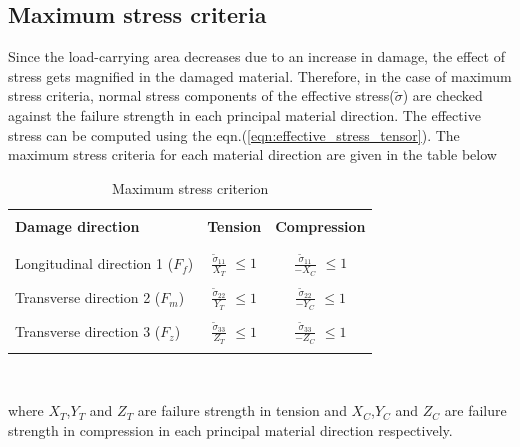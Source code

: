 \documentclass[12pt,twoside]{report}
\begin{document}
\subsection{Maximum stress criteria}\label{Maximum stress criteria}
\indent\indent\indent  Since the load-carrying area decreases due to an increase in damage, the effect of stress gets magnified in the damaged material. Therefore, in the case of maximum stress criteria, normal stress components of the effective stress($\tilde{\sigma}$) are checked against the failure strength in each principal material direction. The effective stress can be computed using the eqn.(\ref{eqn:effective_stress_tensor}). The maximum stress criteria for each material direction are given in the table below\\
\begin{table}[htbp]
  \begin{center}
     \begin{tabular}{l  c  c} 
     \hline
     \\
      \textbf{Damage direction} \;\;& \textbf{Tension} \;& \textbf{Compression}\\
      \\
      \hline
      \\
      Longitudinal direction 1 ($F_{f}$) & \Large{$\frac{\tilde{\sigma}_{11}}{X_{T}} $}\small{ $\leq 1$} & \Large{$\frac{\tilde{\sigma}_{11}}{-X_{C}} $}\small{ $\leq 1$} \\
      \\
      Transverse direction 2 ($F_{m}$)  &  \Large{$\frac{\tilde{\sigma}_{22}}{Y_{T}} $}\small{ $\leq 1$}  & \Large{$\frac{\tilde{\sigma}_{22}}{-Y_{C}} $}\small{ $\leq 1$}\\
      \\
      Transverse direction 3 ($F_{z}$) &  \Large{$\frac{\tilde{\sigma}_{33}}{Z_{T}} $}\small{ $\leq 1$}  &   \Large{$\frac{\tilde{\sigma}_{33}}{-Z_{C}} $}\small{ $\leq 1$}\\
       \\
       \hline
    \end{tabular}
    \\
    \caption{Maximum stress criterion}
    \label{tab:Maximum stress criterion}
  \end{center}
\end{table}
\FloatBarrier
where $X_{T}$,$ Y_{T} $ and $Z_{T}$ are failure strength in tension and $X_{C}$,$ Y_{C} $ and $Z_{C}$ are failure strength in compression in each principal material direction respectively.\\
\\
\end{document}

